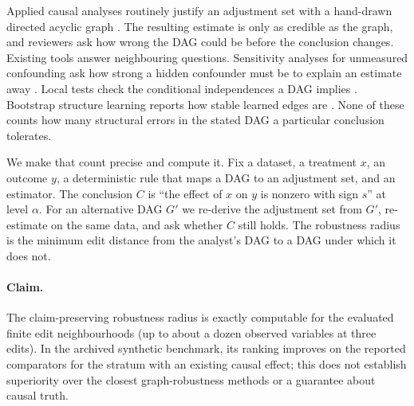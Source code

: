 \documentclass[11pt]{article}
\begin{document}
Applied causal analyses routinely justify an adjustment set with a hand-drawn directed acyclic graph \citep{pearl2009,tennant2021}. The resulting estimate is only as credible as the graph, and reviewers ask how wrong the DAG could be before the conclusion changes. Existing tools answer neighbouring questions. Sensitivity analyses for unmeasured confounding ask how strong a hidden confounder must be to explain an estimate away \citep{rosenbaum2002,ding2016,vanderweele2017,cinelli2020}. Local tests check the conditional independences a DAG implies \citep{textor2017,ankan2021}. Bootstrap structure learning reports how stable learned edges are \citep{friedman1999,scutari2010}. None of these counts how many structural errors in the stated DAG a particular conclusion tolerates.

We make that count precise and compute it. Fix a dataset, a treatment $x$, an outcome $y$, a deterministic rule that maps a DAG to an adjustment set, and an estimator. The conclusion $C$ is ``the effect of $x$ on $y$ is nonzero with sign $s$'' at level $\alpha$. For an alternative DAG $G'$ we re-derive the adjustment set from $G'$, re-estimate on the same data, and ask whether $C$ still holds. The robustness radius is the minimum edit distance from the analyst's DAG to a DAG under which it does not.

\paragraph{Claim.} The claim-preserving robustness radius is exactly computable for the evaluated finite edit neighbourhoods (up to about a dozen observed variables at three edits). In the archived synthetic benchmark, its ranking improves on the reported comparators for the stratum with an existing causal effect; this does not establish superiority over the closest graph-robustness methods or a guarantee about causal truth.
\end{document}
